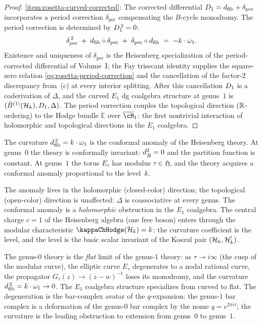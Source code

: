 \begin{proof}
\medskip
\ref{item:rosetta-curved-corrected}: The corrected differential $D_{1} = d_{\mathrm{fib}} + \delta_{\mathrm{per}}$ incorporates a period correction $\delta_{\mathrm{per}}$ compensating the $B$-cycle monodromy. The period correction is determined by $D_{1}^{\,2} = 0$:
\begin{equation}\label{eq:rosetta-period-correction}
\delta_{\mathrm{per}}^{\,2}
\;+\;
d_{\mathrm{fib}} \circ \delta_{\mathrm{per}}
\;+\;
\delta_{\mathrm{per}} \circ d_{\mathrm{fib}}
\;=\;
-k \cdot \omega_1.
\end{equation}
Existence and uniqueness of $\delta_{\mathrm{per}}$ is the Heisenberg specialization of the period-corrected differential of Volume~I; the Fay trisecant identity supplies the square-zero relation \eqref{eq:rosetta-period-correction} and the cancellation of the factor-$2$ discrepancy from~(c) at every interior splitting. After this cancellation $D_{1}$ is a coderivation of $\Delta$, and the curved $E_1$ dg coalgebra structure at genus~$1$ is $(\bar{B}^{(1)}(\mathcal{H}_k), D_{1}, \Delta)$. The period correction couples the topological direction ($\mathbb{R}$-ordering) to the Hodge bundle $\mathbb{E}$ over $\overline{\cM}_1$: the first nontrivial interaction of holomorphic and topological directions in the $E_1$ coalgebra.
\end{proof}

\begin{remark}
\label{rem:rosetta-curvature-physics}
The curvature $d_{\mathrm{fib}}^{\,2} = k \cdot \omega_1$ is the conformal anomaly of the Heisenberg theory. At genus~$0$ the theory is conformally invariant: $d_{\bar{B}}^2 = 0$ and the partition function is constant. At genus~$1$ the torus $E_\tau$ has modulus $\tau \in \mathfrak{H}$, and the theory acquires a conformal anomaly proportional to the level~$k$.

The anomaly lives in the holomorphic (closed-color) direction; the topological (open-color) direction is unaffected: $\Delta$ is coassociative at every genus. The conformal anomaly is a \emph{holomorphic} obstruction in the $E_1$ coalgebra. The central charge $c = 1$ of the Heisenberg algebra (one free boson) enters through the modular characteristic $\kappaChHodge(\cH_k) = k$: the curvature coefficient is the level, and the level is the basic scalar invariant of the Koszul pair $(\mathcal{H}_k, \mathcal{H}_k^!)$.
\end{remark}

\begin{remark}
\label{rem:rosetta-flat-limit}
The genus-$0$ theory is the \emph{flat} limit of the genus-$1$ theory: as $\tau \to i\infty$ (the cusp of the modular curve), the elliptic curve $E_\tau$ degenerates to a nodal rational curve, the propagator $G_\tau(z) \to (z - w)^{-1}$ loses its monodromy, and the curvature $d_{\mathrm{fib}}^{\,2} = k \cdot \omega_1 \to 0$. The $E_1$ coalgebra structure specializes from curved to flat. The degeneration is the bar-complex avatar of the $q$-expansion: the genus-$1$ bar complex is a deformation of the genus-$0$ bar complex by the nome $q = e^{2\pi i \tau}$; the curvature is the leading obstruction to extension from genus~$0$ to genus~$1$.
\end{remark}


